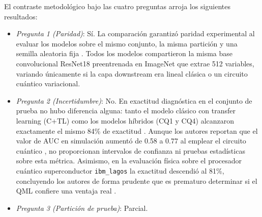 El contraste metodológico bajo las cuatro preguntas arroja los siguientes resultados:
\begin{itemize}
  \item \textit{Pregunta 1 (Paridad)}: Sí. 
La comparación garantizó paridad experimental al evaluar los modelos sobre el mismo conjunto, la misma partición y una semilla aleatoria fija \cite{Azevedo2022QuantumTransfer}. Todos los modelos compartieron la misma base convolucional ResNet18 preentrenada en ImageNet que extrae 512 variables, variando únicamente si la capa downstream era lineal clásica o un circuito cuántico variacional.
  \item \textit{Pregunta 2 (Incertidumbre)}: No. 
En exactitud diagnóstica en el conjunto de prueba no hubo diferencia alguna: tanto el modelo clásico con transfer learning (C+TL) como los modelos híbridos (CQ1 y CQ4) alcanzaron exactamente el mismo 84\% de exactitud \cite{Azevedo2022QuantumTransfer}.
Aunque los autores reportan que el valor de AUC en simulación aumentó de 0.58 a 0.77 al emplear el circuito cuántico \cite{Azevedo2022QuantumTransfer}, no proporcionan intervalos de confianza ni pruebas estadísticas sobre esta métrica.
Asimismo, en la evaluación física sobre el procesador cuántico superconductor \texttt{ibm\_lagos} la exactitud descendió al 81\%, concluyendo los autores de forma prudente que es prematuro determinar si el QML confiere una ventaja real \cite{Azevedo2022QuantumTransfer}.
  \item \textit{Pregunta 3 (Partición de prueba)}: Parcial. 

\end{itemize}

